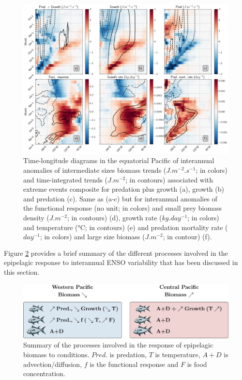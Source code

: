 \begin{figure}[h!tp]
	\centering
	\includegraphics[scale=0.4]{figs/fig9.png}	
	\caption{Time-longitude diagrams in the equatorial Pacific of interannual anomalies of intermediate sizes biomass trends ($J.m^{-2}.s^{-1}$; in colors) and time-integrated trends ($J.m^{-2}$; in contours) associated with extreme \nino{} events composite for predation plus growth (a), growth (b) and predation (c). Same as (a-c) but for interannual anomalies of the functional response (no unit; in colors) and small prey biomass density ($J.m^{-2}$; in contours) (d), growth rate ($kg.day^{-1}$; in colors) and temperature (°C; in contours) (e) and predation mortality rate ($day^{-1}$; in colors) and large size biomass ($J.m^{-2}$; in contour) (f).}
	\label{fig:fig9}
\end{figure}

Figure \ref{fig:proc_summary} provides a brief summary of the different processes involved in the epipelagic response to interannual ENSO variability that has been discussed in this section.

\begin{figure}[h!tp]
	\centering
        \includegraphics[scale=0.6]{figs/conclusion/conlusion_fig.pdf}	
        \caption{Summary of the processes involved in the response of epipelagic biomass to \nino{} conditions.  $Pred.$ is predation, $T$ is temperature, $A+D$ is advection/diffusion, $f$ is the functional response and $F$ is food concentration.}
	\label{fig:proc_summary}
\end{figure}




